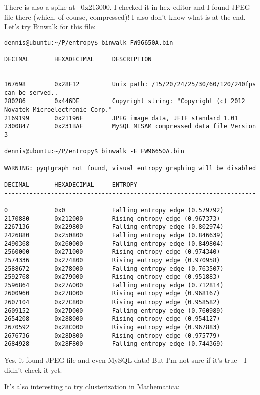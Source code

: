 There is also a spike at ~0x213000. I checked it in hex editor and I found JPEG file there 
(which, of course, compressed)!
I also don't know what is at the end.
Let's try Binwalk for this file:

\begin{lstlisting}
dennis@ubuntu:~/P/entropy$ binwalk FW96650A.bin 

DECIMAL       HEXADECIMAL     DESCRIPTION
--------------------------------------------------------------------------------
167698        0x28F12         Unix path: /15/20/24/25/30/60/120/240fps can be served..
280286        0x446DE         Copyright string: "Copyright (c) 2012 Novatek Microelectronic Corp."
2169199       0x21196F        JPEG image data, JFIF standard 1.01
2300847       0x231BAF        MySQL MISAM compressed data file Version 3

dennis@ubuntu:~/P/entropy$ binwalk -E FW96650A.bin 

WARNING: pyqtgraph not found, visual entropy graphing will be disabled

DECIMAL       HEXADECIMAL     ENTROPY
--------------------------------------------------------------------------------
0             0x0             Falling entropy edge (0.579792)
2170880       0x212000        Rising entropy edge (0.967373)
2267136       0x229800        Falling entropy edge (0.802974)
2426880       0x250800        Falling entropy edge (0.846639)
2490368       0x260000        Falling entropy edge (0.849804)
2560000       0x271000        Rising entropy edge (0.974340)
2574336       0x274800        Rising entropy edge (0.970958)
2588672       0x278000        Falling entropy edge (0.763507)
2592768       0x279000        Rising entropy edge (0.951883)
2596864       0x27A000        Falling entropy edge (0.712814)
2600960       0x27B000        Rising entropy edge (0.968167)
2607104       0x27C800        Rising entropy edge (0.958582)
2609152       0x27D000        Falling entropy edge (0.760989)
2654208       0x288000        Rising entropy edge (0.954127)
2670592       0x28C000        Rising entropy edge (0.967883)
2676736       0x28D800        Rising entropy edge (0.975779)
2684928       0x28F800        Falling entropy edge (0.744369)
\end{lstlisting}

Yes, it found JPEG file and even MySQL data!
But I'm not sure if it's true---I didn't check it yet.

It's also interesting to try clusterization in Mathematica:

